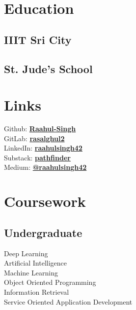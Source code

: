 \documentclass[]{raahul_singh_resume}
\begin{document}

\begin{minipage}[t]{0.33\textwidth} 

\section{Education} 

\subsection{IIIT Sri City}
\sectionsep

\subsection{St. Jude's School}
\sectionsep

\section{Links} 
Github: \href{https://github.com/Raahul-Singh}{\bf Raahul-Singh} \\
GitLab:  \href{https://gitlab.com/rasalghul2}{\bf rasalghul2} \\
LinkedIn:  \href{https://linkedin.com/in/raahulsingh42}{\bf raahulsingh42} \\
Substack:  \href{https://raahulsingh.substack.com}{\bf pathfinder} \\
Medium:  \href{https://medium.com/@_hawks_}{\bf @raahulsingh42} \\

\section{Coursework}
\subsection{Undergraduate}
\textbullet{}Deep Learning \\
\textbullet{}Artificial Intelligence \\
\textbullet{}Machine Learning \\
\textbullet{}Object Oriented Programming \\
\textbullet{}Information Retrieval \\
\textbullet{}Service Oriented Application Development  \\
\sectionsep


\end{minipage}
\end{document}
